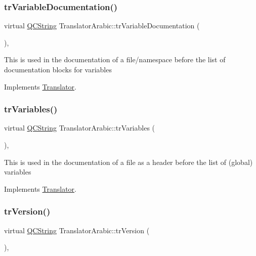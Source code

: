 \subsubsection{\texorpdfstring{trVariableDocumentation()}{trVariableDocumentation()}}
{\footnotesize\ttfamily virtual \mbox{\hyperlink{class_q_c_string}{Q\+C\+String}} Translator\+Arabic\+::tr\+Variable\+Documentation (\begin{DoxyParamCaption}{ }\end{DoxyParamCaption})\hspace{0.3cm}{\ttfamily [inline]}, {\ttfamily [virtual]}}

This is used in the documentation of a file/namespace before the list of documentation blocks for variables 

Implements \mbox{\hyperlink{class_translator}{Translator}}.

\mbox{\label{class_translator_arabic_a621dbf463cf8716cc73199fdebe67376}} 
\subsubsection{\texorpdfstring{trVariables()}{trVariables()}}
{\footnotesize\ttfamily virtual \mbox{\hyperlink{class_q_c_string}{Q\+C\+String}} Translator\+Arabic\+::tr\+Variables (\begin{DoxyParamCaption}{ }\end{DoxyParamCaption})\hspace{0.3cm}{\ttfamily [inline]}, {\ttfamily [virtual]}}

This is used in the documentation of a file as a header before the list of (global) variables 

Implements \mbox{\hyperlink{class_translator}{Translator}}.

\mbox{\label{class_translator_arabic_ab3f45911a62c7c316ed65c8d7454c102}} 
\subsubsection{\texorpdfstring{trVersion()}{trVersion()}}
{\footnotesize\ttfamily virtual \mbox{\hyperlink{class_q_c_string}{Q\+C\+String}} Translator\+Arabic\+::tr\+Version (\begin{DoxyParamCaption}{ }\end{DoxyParamCaption})\hspace{0.3cm}{\ttfamily [inline]}, {\ttfamily [virtual]}}

